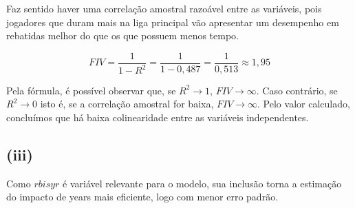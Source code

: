 \documentclass[hidelinks,11pt]{book}
\theoremstyle{definition}
\begin{document}
Faz sentido haver uma correlação amostral razoável entre as variáveis, pois jogadores que duram mais na liga principal vão apresentar um desempenho em rebatidas melhor do que os que possuem menos tempo.

\begin{displaymath}
	FIV = \frac{1}{1 - R^2} = \frac{1}{1 - 0,487} = \frac{1}{0,513} \approx 1,95
\end{displaymath}

Pela fórmula, é possível observar que, se $R^2 \rightarrow 1$, $FIV \rightarrow \infty$. Caso contrário, se $R^2 \rightarrow 0$ isto é, se a correlação amostral for baixa, $FIV \rightarrow \infty$. Pelo valor calculado, concluímos que há baixa colinearidade entre as variáveis independentes.

\subsection*{(iii)}


Como $rbisyr$ é variável relevante para o modelo, sua inclusão torna a estimação do impacto de years mais eficiente, logo com menor erro padrão.
\end{document}
